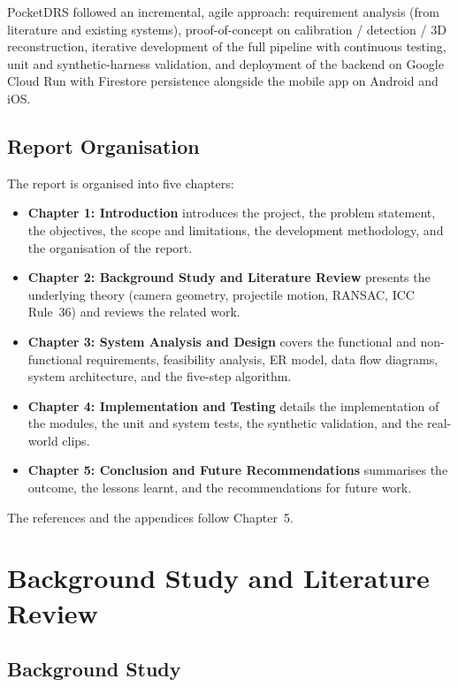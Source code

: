 \documentclass[12pt,a4paper]{report}
\begin{document}
PocketDRS followed an incremental, agile approach: requirement analysis (from literature and existing systems), proof-of-concept on calibration / detection / 3D reconstruction, iterative development of the full pipeline with continuous testing, unit and synthetic-harness validation, and deployment of the backend on Google Cloud Run with Firestore persistence alongside the mobile app on Android and iOS.

\section{Report Organisation}

The report is organised into five chapters:

\begin{itemize}
    \item \textbf{Chapter 1: Introduction} introduces the project, the problem statement, the objectives, the scope and limitations, the development methodology, and the organisation of the report.
    \item \textbf{Chapter 2: Background Study and Literature Review} presents the underlying theory (camera geometry, projectile motion, RANSAC, ICC Rule~36) and reviews the related work.
    \item \textbf{Chapter 3: System Analysis and Design} covers the functional and non-functional requirements, feasibility analysis, ER model, data flow diagrams, system architecture, and the five-step algorithm.
    \item \textbf{Chapter 4: Implementation and Testing} details the implementation of the modules, the unit and system tests, the synthetic validation, and the real-world clips.
    \item \textbf{Chapter 5: Conclusion and Future Recommendations} summarises the outcome, the lessons learnt, and the recommendations for future work.
\end{itemize}

The references and the appendices follow Chapter~5.

\chapter{Background Study and Literature Review}

\section{Background Study}
\end{document}
